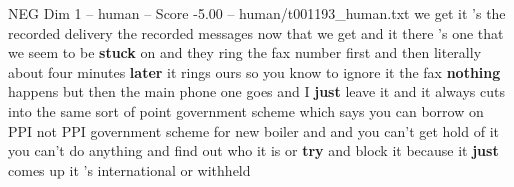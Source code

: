\begin{textsample}{NEG Dim 1 – human – Score -5.00 – human/t001193\_human.txt}  \label{ex:f1_neg_035}
we get it 's the recorded delivery the recorded messages now that we get and it there 's one that we seem to be \textbf{stuck} on and they ring the fax number first and then literally about four minutes \textbf{later} it rings ours so you know to ignore it the fax \textbf{nothing} happens but then the main phone one goes and I \textbf{just} leave it and it always cuts into the same sort of point government scheme which says you can borrow on PPI not PPI government scheme for new boiler and and you can't get hold of it you can't do anything and find out who it is or \textbf{try} and block it because it \textbf{just} comes up it 's international or withheld

\end{textsample}
